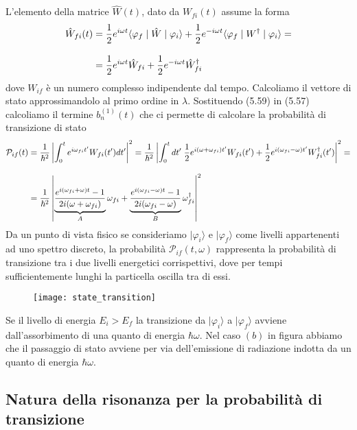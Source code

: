 L'elemento della matrice $\hat{W}(t)$, dato da $W_{fi}(t)$ assume la forma
\begin{align}
	\hat{W}_{fi}(t) & =\frac{1}{2}e^{i \omega t}\langle \varphi_f \mid \hat{W} \mid \varphi_i \rangle + \frac{1}{2}e^{-i \omega t}\langle \varphi_f \mid W^{\dag} \mid \varphi_i \rangle  = \notag \\[0.3cm]
	& = \frac{1}{2}e^{i \omega t} \hat{W}_{fi} + \frac{1}{2}e^{-i \omega t}\hat{W}_{fi}^{\dag}
\end{align}
dove $W_{if}$ \`e un numero complesso indipendente dal tempo. Calcoliamo il vettore di stato approssimandolo al primo ordine in $\lambda$. Sostituendo (5.59) in (5.57) calcoliamo il termine $b_n^{(1)}(t)$ che ci permette di calcolare la probabilit\`a di transizione di stato
\begin{align}
	\mathcal{P}_{if}(t) & = \frac{1}{\hbar^2} \left | \int_0^t e^{i\omega_{fi}t'}W_{fi}(t')dt' \right|^2 = \frac{1}{\hbar^2} \left| \int_0^t dt' \; \frac{1}{2}e^{i (\omega + \omega_{fi})t'}W_{fi}(t') + \frac{1}{2}e^{i(\omega_{fi}-\omega)t'}W^{\dag}_{fi}(t')\right|^2 = \notag \\[0.3cm]
	& = \frac{1}{\hbar^2} \left | \underbrace{\frac{e^{i(\omega_{fi}+\omega)t}-1}{2i(\omega + \omega_{fi})}}_{A}\omega_{fi} +  \underbrace{\frac{e^{i(\omega_{fi}-\omega)t}-1}{2i(\omega_{fi}-\omega)}}_{B}\omega_{fi}^{\dag} \right|^2
\end{align}
Da un punto di vista fisico se consideriamo $|\varphi_i \rangle $ e $|\varphi_f \rangle$ come livelli appartenenti ad uno spettro discreto, la probabilit\`a $\mathcal{P}_{if}(t,\omega)$ rappresenta la probabilit\`a di transizione tra i due livelli energetici corrispettivi, dove per tempi sufficientemente lunghi la particella oscilla tra di essi.
\begin{figure}[!ht]
\vspace{0.1in}
\texttt{[image: state\_transition]}	
\centering
\end{figure}

Se il livello di energia $E_i > E_f$ la transizione da $|\varphi_i \rangle $ a $|\varphi_f \rangle $ avviene dall'assorbimento di una quanto di energia $\hbar \omega$. Nel caso $(b)$ in figura abbiamo che il passaggio di stato avviene per via dell'emissione di radiazione indotta da un quanto di energia $\hbar \omega$.
\newpage

\subsection{Natura della risonanza per la probabilit\`a di transizione}

